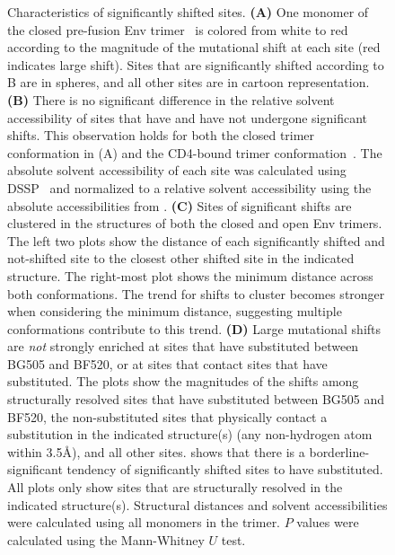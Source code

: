 \documentclass[9pt]{elife}
\newcommand{\angstrom}{\textup{\AA}}
\begin{document}
\begin{figure}
\caption{\label{fig:shiftfeatures}
Characteristics of significantly shifted sites.
{\bf (A)} One monomer of the closed pre-fusion Env trimer~\citep[PDB 5FYL;][]{stewart2016trimeric} is colored from white to red according to the magnitude of the mutational shift at each site (red indicates large shift).
Sites that are significantly shifted according to B are in spheres, and all other sites are in cartoon representation.
{\bf (B)} 
There is no significant difference in the relative solvent accessibility of sites that have and have not undergone significant shifts.
This observation holds for both the closed trimer conformation in (A) and the CD4-bound trimer conformation~\citep[PDB 5VN3;][]{ozorowski2017open}.
The absolute solvent accessibility of each site was calculated using DSSP~\citep{kabsch1983dictionary} and normalized to a relative solvent accessibility using the absolute accessibilities from \citet{tien2013maximum}.
{\bf (C)} 
Sites of significant shifts are clustered in the structures of both the closed and open Env trimers.
The left two plots show the distance of each significantly shifted and not-shifted site to the closest other shifted site in the indicated structure.
The right-most plot shows the minimum distance across both conformations.
The trend for shifts to cluster becomes stronger when considering the minimum distance, suggesting multiple conformations contribute to this trend.
{\bf (D)}
Large mutational shifts are \emph{not} strongly enriched at sites that have substituted between BG505 and BF520, or at sites that contact sites that have substituted. 
The plots show the magnitudes of the shifts among structurally resolved sites that have substituted between BG505 and BF520, the non-substituted sites that physically contact a substitution in the indicated structure(s) (any non-hydrogen atom within 3.5\angstrom), and all other sites.
 shows that there is a borderline-significant tendency of significantly shifted sites to have substituted.
All plots only show sites that are structurally resolved in the indicated structure(s). 
Structural distances and solvent accessibilities were calculated using all monomers in the trimer.
$P$ values were calculated using the Mann-Whitney $U$ test.
}
{}


\end{figure}
\end{document}
